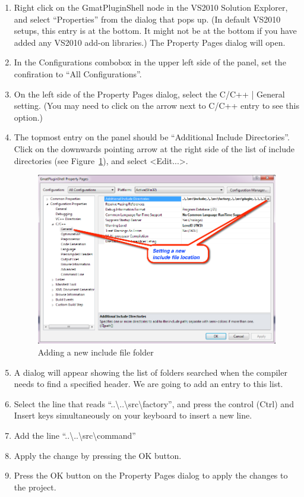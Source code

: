\documentclass[10pt,letterpaper]{article}
\begin{document}
\begin{enumerate}
\item Right click on the GmatPluginShell node in the VS2010 Solution Explorer, and select ``Properties'' from the dialog that pops up.  (In default VS2010 setups, this entry is at the bottom.  It might not be at the bottom if you have added any VS2010 add-on libraries.)  The Property Pages dialog will open.
\item In the Configurations combobox in the upper left side of the panel, set the confiration to ``All Configurations''. 
\item On the left side of the Property Pages dialog, select the C/C++ | General setting.  (You may need to click on the arrow next to C/C++ entry to see this option.)
\item The topmost entry on the panel should be ``Additional Include Directories''.  Click on the downwards pointing arrow at the right side of the list of include directories (see Figure~\ref{IncludeLoc}), and select {\textless}Edit...{\textgreater}. 
\begin{figure}[htb]
\begin{center}
\includegraphics[scale=0.5]{images/SettingIncludeLocation.png}
\caption{\label{IncludeLoc}Adding a new include file folder}
\end{center}
\end{figure}

\item A dialog will appear showing the list of folders searched when the compiler needs to find a specified header.  We are going to add an entry to this list.
\item Select the line that reads ``..{\textbackslash}..{\textbackslash}src{\textbackslash}factory'', and press the control (Ctrl) and Insert keys simultaneously on your keyboard to insert a new line.
\item Add the line ``..{\textbackslash}..{\textbackslash}src{\textbackslash}command''
\item Apply the change by pressing the OK button.
\item Press the OK button on the Property Pages dialog to apply the changes to the project.
\end{enumerate}
\end{document}
